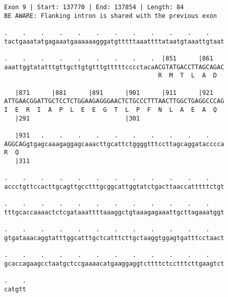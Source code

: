 \documentclass{article}
\begin{document}
\begin{Verbatim}[fontfamily=courier]
Exon 9 | Start: 137770 | End: 137854 | Length: 84
BE AWARE: Flanking intron is shared with the previous exon

.    .    .    .    .    .    .    .    .    .    .    .    
tactgaaatatgagaaatgaaaaaagggatgtttttaaattttataatgtaaattgtaat

.    .    .    .    .    .    .    .    .  |851      |861   
aaattggtatatttgttgcttgtgtttgtttttcccctacaACGTATGACCTTAGCAGAC
                                          R  M  T  L  A  D  

   |871      |881      |891      |901      |911      |921   
ATTGAACGGATTGCTCCTCTGGAAGAGGGAACTCTGCCCTTTAACTTGGCTGAGGCCCAG
I  E  R  I  A  P  L  E  E  G  T  L  P  F  N  L  A  E  A  Q  
   |291                          |301                       

   |931   .    .    .    .    .    .    .    .    .    .    
AGGCAGgtgagcaaagaggagcaaacttgcattctggggtttccttagcaggatacccca
R  Q                                                        
   |311                                                     

.    .    .    .    .    .    .    .    .    .    .    .    
accctgttccacttgcagttgcctttgcggcattggtatctgacttaaccatttttctgt

.    .    .    .    .    .    .    .    .    .    .    .    
tttgcaccaaaactctcgataaattttaaaggctgtaaagagaaattgcttagaaatggt

.    .    .    .    .    .    .    .    .    .    .    .    
gtgataaacaggtatttggcatttgctcatttcttgctaaggtggagtgatttcctaact

.    .    .    .    .    .    .    .    .    .    .    .    
gcaccagaagcctaatgctccgaaaacatgaaggaggtcttttctcctttcttgaagtct

.    .
catgtt
\end{Verbatim}
\newpage
\end{document}
